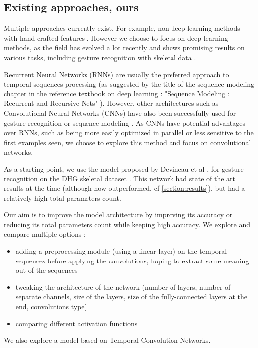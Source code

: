 \documentclass{article}
\begin{document}
\subsection{Existing approaches, ours}
Multiple approaches currently exist. For example, non-deep-learning methods with hand crafted features \cite{dhg-non-deep-approach}. However we choose to focus on deep learning methods, as the field has evolved a lot recently and shows promising results on various tasks, including gesture recognition with skeletal data \cite{Maghoumi-deep-gru}.
\par
Recurrent Neural Networks (RNNs) are usually the preferred approach to temporal sequences processing (as suggested by the title of the sequence modeling chapter in the reference textbook on deep learning : "Sequence Modeling : Recurrent and Recursive Nets" \cite{Goodfellow-et-al-2016}). However, other architectures such as Convolutional Neural Networks (CNNs) have also been successfully used for gesture recognition \cite{Devineau} or sequence modeling \cite{Bai2018-tcn}. As CNNs have potential advantages over RNNs, such as being more easily optimized in parallel or less sensitive to the first examples seen, we choose to explore this method and focus on convolutional networks.
\par
As a starting point, we use the model proposed by Devineau et al \cite{Devineau}, for gesture recognition on the DHG skeletal dataset \cite{dhg-non-deep-approach}. This network had state of the art results at the time (although now outperformed, cf \ref{section:results}), but had a relatively high total parameters count.
\par
Our aim is to improve the model architecture by improving its accuracy or reducing its total parameters count while keeping high accuracy. We explore and compare multiple options :
\begin{itemize}
    \item adding a preprocessing module (using a linear layer) on the temporal sequences before applying the convolutions, hoping to extract some meaning out of the sequences
    \item tweaking the architecture of the network (number of layers, number of separate channels, size of the layers, size of the fully-connected layers at the end, convolutions type)
    \item comparing different activation functions
\end{itemize}
We also explore a model based on Temporal Convolution Networks.
\end{document}
